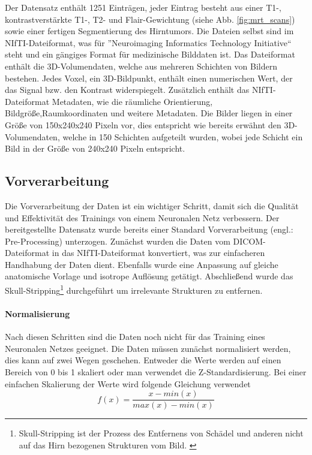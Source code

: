 Der Datensatz enthält 1251 Einträgen, jeder Eintrag besteht aus einer T1-, kontrastverstärkte T1-, T2- und Flair-Gewichtung (siehe Abb. \ref{fig:mrt_scans}) sowie einer fertigen Segmentierung des Hirntumors. Die Dateien selbst sind im NIfTI-Dateiformat, was für ''Neuroimaging Informatics Technology Initiative`` steht und ein gängiges Format für medizinische Bilddaten ist. Das Dateiformat enthält die 3D-Volumendaten, welche aus mehreren Schichten von Bildern bestehen. Jedes Voxel, ein 3D-Bildpunkt, enthält einen numerischen Wert, der das Signal bzw. den Kontrast widerspiegelt. Zusätzlich enthält das NIfTI-Dateiformat Metadaten, wie die räumliche Orientierung, Bildgröße,Raumkoordinaten und weitere Metadaten. \cite[][]{NIfTI} Die Bilder liegen in einer Größe von 150x240x240 Pixeln vor, dies entspricht wie bereits erwähnt den 3D-Volumendaten, welche in 150 Schichten aufgeteilt wurden, wobei jede Schicht ein Bild in der Größe von 240x240 Pixeln entspricht.


\subsection{Vorverarbeitung}
\label{subsec:Vorverarbeitung}
Die Vorverarbeitung der Daten ist ein wichtiger Schritt, damit sich die Qualität und Effektivität des Trainings von einem Neuronalen Netz verbessern. Der bereitgestellte Datensatz wurde bereits einer Standard Vorverarbeitung (engl.: Pre-Processing) unterzogen. Zunächst wurden die Daten vom DICOM-Dateiformat in das NIfTI-Dateiformat konvertiert, was zur einfacheren Handhabung der Daten dient. Ebenfalls wurde eine Anpassung auf gleiche anatomische Vorlage und isotrope Auflösung getätigt. Abschließend wurde  das Skull-Stripping\footnote{Skull-Stripping ist der Prozess des Entfernens von Schädel und anderen nicht auf das Hirn bezogenen Strukturen vom Bild. \cite[vgl.][]{SwiebockaWiek2016}} durchgeführt um irrelevante Strukturen zu entfernen. \cite[vgl.][]{Baid2021}

\paragraph{Normalisierung}
Nach diesen Schritten sind die Daten noch nicht für das Training eines Neuronalen Netzes geeignet. Die Daten müssen zunächst normalisiert werden, dies kann auf zwei Wegen geschehen. Entweder die Werte werden auf einen Bereich von 0 bis 1 skaliert oder man verwendet die Z-Standardisierung. Bei einer einfachen Skalierung der Werte wird folgende Gleichung verwendet
\begin{equation}
	f(x)=\frac{x - min(x)}{max(x) - min(x)}
\end{equation}

